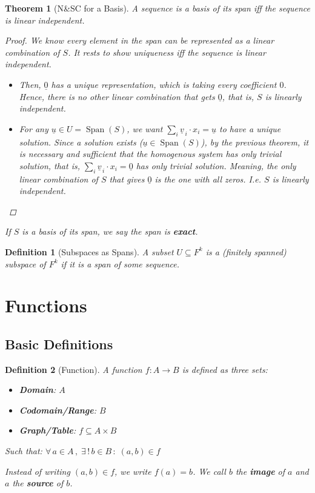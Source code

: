 \documentclass[12pt]{article}
\let\RA\Rightarrow
\let\LA\Leftarrow
\newcommand{\Forall}[1]{\forall\,{#1}\,,\;}
\newcommand{\Exist}[1]{\exists\,{#1}\,:\;}
\newcommand{\tuple}[1]{\underline{#1}}
\DeclareMathOperator{\Span}{Span}
\newtheorem{theorem}{Theorem}[subsection]
\newtheorem{definition}{Definition}[subsection]
\begin{document}
\begin{theorem}[N\&SC for a Basis]
  A sequence is a basis of its span iff the sequence is linear independent.
  \begin{proof}
    We know every element in the span can be represented as a linear combination of $S$. It rests to show uniqueness iff the sequence is linear independent.

    \begin{itemize}
      \item[$(\RA)$] Then, $\tuple{0}$ has a unique representation, which is taking every coefficient $0$. Hence, there is no other linear combination that gets $\tuple{0}$, that is, $S$ is linearly independent.
      \item[$(\LA)$] For any $\tuple{u}\in U=\Span(S)$, we want $\sum_i  \tuple{v}_{\,i}\cdot x_i = \tuple{u}$ to have a unique solution. Since a solution exists ($\tuple{u}\in\Span(S)$), by the previous theorem, it is necessary and sufficient that the homogenous system has only trivial solution, that is, $\sum_i  \tuple{v}_{\,i}\cdot x_i = \tuple{0}$ has only trivial solution. Meaning, the only linear combination of $S$ that gives $\tuple{0}$ is the one with all zeros. I.e. $S$ is linearly independent.
    \end{itemize}
  \end{proof} 
  If $S$ is a basis of its span, we say the span is \textbf{exact}.
\end{theorem}

\begin{definition}[Subspaces as Spans]
  A subset $U\subseteq F^k$ is a (finitely spanned) subspace of $F^k$ if it is a span of some sequence. 
\end{definition}

\pagebreak

\section{Functions}

\subsection{Basic Definitions}

\begin{definition}[Function]
  A function $f:A\to B$ is defined as three sets:
  \begin{itemize}
    \item \textbf{Domain}: $A$
    \item \textbf{Codomain/Range}: $B$
    \item \textbf{Graph/Table}: $f\subseteq A\times B$
  \end{itemize}
  Such that: $\Forall{a\in A}\Exist{!\,b\in B}(a,b)\in f$

  Instead of writing $(a,b)\in f$, we write $f(a)=b$. We call $b$ the \textbf{image} of $a$ and $a$ the \textbf{source} of $b$.
\end{definition}
\end{document}
